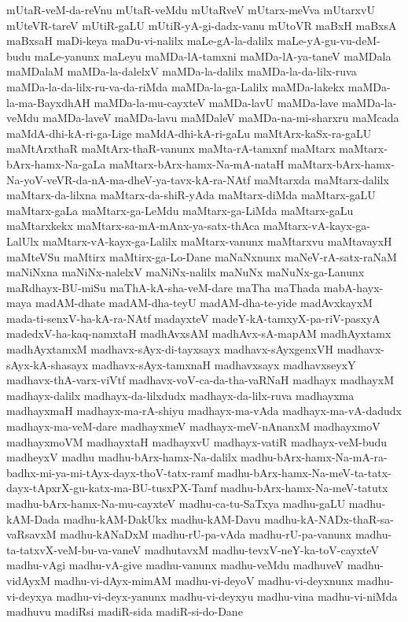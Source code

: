 {mUtaR-veM-da-reVnu
mUtaR-veMdu
mUtaRveV
mUtarx-meVva
mUtarxvU
mUteVR-tareV
mUtiR-gaLU
mUtiR-yA-gi-dadx-vanu
mUtoVR
maBxH
maBxsA
maBxsaH
maDi-keya
maDu-vi-nalilx
maLe-gA-la-dalilx
maLe-yA-gu-vu-deM-budu
maLe-yanunx
maLeyu
maMDa-lA-tamxni
maMDa-lA-ya-taneV
maMDala
maMDalaM
maMDa-la-dalelxV
maMDa-la-dalilx
maMDa-la-da-lilx-ruva
maMDa-la-da-lilx-ru-va-da-riMda
maMDa-la-ga-Lalilx
maMDa-lakekx
maMDa-la-ma-BayxdhAH
maMDa-la-mu-cayxteV
maMDa-lavU
maMDa-lave
maMDa-la-veMdu
maMDa-laveV
maMDa-lavu
maMDaleV
maMDa-na-mi-sharxru
maMcada
maMdA-dhi-kA-ri-ga-Lige
maMdA-dhi-kA-ri-gaLu
maMtArx-kaSx-ra-gaLU
maMtArxthaR
maMtArx-thaR-vanunx
maMta-rA-tamxnf
maMtarx
maMtarx-bArx-hamx-Na-gaLa
maMtarx-bArx-hamx-Na-mA-nataH
maMtarx-bArx-hamx-Na-yoV-veVR-da-nA-ma-dheV-ya-tavx-kA-ra-NAtf
maMtarxda
maMtarx-dalilx
maMtarx-da-lilxna
maMtarx-da-shiR-yAda
maMtarx-diMda
maMtarx-gaLU
maMtarx-gaLa
maMtarx-ga-LeMdu
maMtarx-ga-LiMda
maMtarx-gaLu
maMtarxkekx
maMtarx-sa-mA-mAnx-ya-satx-thAca
maMtarx-vA-kayx-ga-LalUlx
maMtarx-vA-kayx-ga-Lalilx
maMtarx-vanunx
maMtarxvu
maMtavayxH
maMteVSu
maMtirx
maMtirx-ga-Lo-Dane
maNaNxnunx
maNeV-rA-satx-raNaM
maNiNxna
maNiNx-nalelxV
maNiNx-nalilx
maNuNx
maNuNx-ga-Lanunx
maRdhayx-BU-miSu
maThA-kA-sha-veM-dare
maTha
maThada
mabA-hayx-maya
madAM-dhate
madAM-dha-teyU
madAM-dha-te-yide
madAvxkayxM
mada-ti-senxV-ha-kA-ra-NAtf
madayxteV
madeY-kA-tamxyX-pa-riV-pasxyA
madedxV-ha-kaq-namxtaH
madhAvxsAM
madhAvx-sA-mapAM
madhAyxtamx
madhAyxtamxM
madhavx-sAyx-di-tayxsayx
madhavx-sAyxgenxVH
madhavx-sAyx-kA-shasayx
madhavx-sAyx-tamxnaH
madhavxsayx
madhavxseyxY
madhavx-thA-varx-viVtf
madhavx-voV-ca-da-tha-vaRNaH
madhayx
madhayxM
madhayx-dalilx
madhayx-da-lilxdudx
madhayx-da-lilx-ruva
madhayxma
madhayxmaH
madhayx-ma-rA-shiyu
madhayx-ma-vAda
madhayx-ma-vA-dadudx
madhayx-ma-veM-dare
madhayxmeV
madhayx-meV-nAnanxM
madhayxmoV
madhayxmoVM
madhayxtaH
madhayxvU
madhayx-vatiR
madhayx-veM-budu
madheyxV
madhu
madhu-bArx-hamx-Na-dalilx
madhu-bArx-hamx-Na-mA-ra-badhx-mi-ya-mi-tAyx-dayx-thoV-tatx-ramf
madhu-bArx-hamx-Na-meV-ta-tatx-dayx-tApxrX-gu-katx-ma-BU-tusxPX-Tamf
madhu-bArx-hamx-Na-meV-tatutx
madhu-bArx-hamx-Na-mu-cayxteV
madhu-ca-tu-SaTxya
madhu-gaLU
madhu-kAM-Dada
madhu-kAM-DakUkx
madhu-kAM-Davu
madhu-kA-NADx-thaR-sa-vaRsavxM
madhu-kANaDxM
madhu-rU-pa-vAda
madhu-rU-pa-vanunx
madhu-ta-tatxvX-veM-bu-va-vaneV
madhutavxM
madhu-tevxV-neY-ka-toV-cayxteV
madhu-vAgi
madhu-vA-give
madhu-vanunx
madhu-veMdu
madhuveV
madhu-vidAyxM
madhu-vi-dAyx-mimAM
madhu-vi-deyoV
madhu-vi-deyxnunx
madhu-vi-deyxya
madhu-vi-deyx-yanunx
madhu-vi-deyxyu
madhu-vina
madhu-vi-niMda
madhuvu
madiRsi
madiR-sida
madiR-si-do-Dane
}
